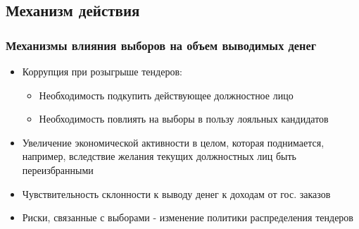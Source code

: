 \subsection{Механизм действия}

\begin{frame}
\frametitle{Механизмы влияния выборов на объем выводимых денег}
\begin{itemize}
	
\item Коррупция при розыгрыше тендеров:
	\begin{itemize}
	\item Необходимость подкупить действующее должностное лицо
	\item Необходимость повлиять на выборы в пользу лояльных кандидатов
	\end{itemize}

\item Увеличение экономической активности в целом, которая поднимается, например, вследствие желания текущих должностных лиц быть переизбранными

\item Чувствительность склонности к выводу денег к доходам от гос. заказов

\item Риски, связанные с выборами - изменение политики распределения тендеров
\end{itemize}
\end{frame}
